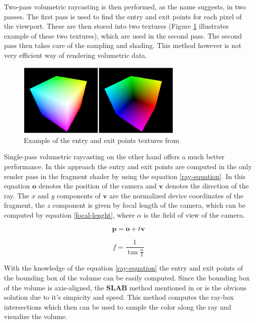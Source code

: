 \documentclass[a4paper, 12pt]{article}
\begin{document}
Two-pass volumetric raycasting is then performed, as the name suggests, in two passes. The first pass is used to find the entry and exit points
for each pixel of the viewport. These are then stored into two textures (Figure \ref{fig:textures} illustrates example of these two textures), 
which are used in the second pass. The second pass then takes care of the sampling and shading. This method however is not very efficient way 
of rendering volumetric data. \\

\begin{figure}[htb]
  \centering
  \includegraphics[width=8cm,keepaspectratio]{textures.png}
  \caption{Example of the entry and exit points textures from \cite{gpu-accelerated-rendering-article}}
  \label{fig:textures}
\end{figure}

Single-pass volumetric raycasting on the other hand offers a much better performance. In this approach the entry and exit points are computed in the
only render pass in the fragment shader by using the equation \ref{ray-equation}. In this equation $ \textbf{o} $ denotes the position of the camera and $ \textbf{v} $ denotes the
direction of the ray. The $ x $ and $ y $ components of $ \textbf{v} $ are the normalized device coordinates of the fragment, the $ z $ component is given
by focal length of the camera, which can be computed by equation \ref{focal-lenght}, where $ \alpha $ is the field of view of the camera.

\begin{equation}
  \label{ray-equation}
  \textbf{p} = \textbf{o} + t\textbf{v}
\end{equation}

\begin{equation}
  \label{focal-lenght}
  f = \frac{1}{\tan \frac{\alpha}{2}}
\end{equation}

With the knowledge of the equation \ref{ray-equation} the entry and exit points of the bounding box of the volume can be easily computed. Since the bounding box
of the volume is axis-aligned, the \textbf{SLAB} method mentioned in \cite{Shirley2021} or \cite{slab-method} is the obvious solution due to it's simpicity and speed. 
This method computes the ray-box intersections which then can be used to sample the color along the ray and visualize the volume.
\end{document}
